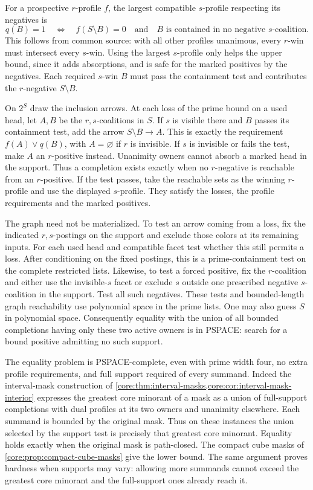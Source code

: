 For a prospective $r$-profile $f$, the largest
compatible $s$-profile respecting its negatives is
\[
 q(B)=1\quad\Longleftrightarrow\quad
  f(S\setminus B)=0\quad\text{and}\quad
  B\text{ is contained in no negative }s\text{-coalition}.
\]
This follows from common source: with all other
profiles unanimous, every $r$-win must intersect every
$s$-win. Using the largest $s$-profile only helps
the upper bound, since it adds absorptions, and is
safe for the marked positives by the negatives.
Each required $s$-win $B$ must pass the containment
test and contributes the $r$-negative $S\setminus B$.

On $2^S$ draw the inclusion arrows. At each loss of
the prime bound on a used head, let $A,B$ be the
$r,s$-coalitions in $S$. If $s$ is visible there and
$B$ passes its containment test, add the arrow
$S\setminus B\to A$. This is exactly the requirement
$f(A)\lor q(B)$, with $A=\varnothing$ if $r$ is
invisible. If $s$ is invisible or fails the test,
make $A$ an $r$-positive instead. Unanimity owners
cannot absorb a marked head in the support.
Thus a completion exists exactly when no $r$-negative
is reachable from an $r$-positive. If the test passes,
take the reachable sets as the winning $r$-profile
and use the displayed $s$-profile. They satisfy the
losses, the profile requirements and the marked
positives.

The graph need not be materialized. To test an arrow
coming from a loss, fix the indicated $r,s$-postings
on the support and exclude those colors at its
remaining inputs. For each used head and compatible
facet test whether this still permits a loss. After
conditioning on the fixed postings, this is a
prime-containment test on the complete restricted
lists. Likewise, to test a forced positive, fix the
$r$-coalition and either use the invisible-$s$ facet
or exclude $s$ outside one prescribed negative
$s$-coalition in the support. Test all such negatives.
These tests and bounded-length graph reachability
use polynomial space in the prime lists. One may also
guess $S$ in polynomial space. Consequently equality
with the union of all bounded completions having
only these two active owners is in PSPACE: search
for a bound positive admitting no such support.

The equality problem is PSPACE-complete, even with
prime width four, no extra profile requirements,
and full support required of every summand. Indeed
the interval-mask construction of
\cref{core:thm:interval-masks,core:cor:interval-mask-interior}
expresses the greatest core minorant of a mask as a
union of full-support completions with dual profiles
at its two owners and unanimity elsewhere. Each
summand is bounded by the original mask. Thus on
these instances the union selected by the support
test is precisely that greatest core minorant.
Equality holds exactly when the original mask is
path-closed. The compact cube masks of
\cref{core:prop:compact-cube-masks} give the lower
bound. The same argument proves hardness when
supports may vary: allowing more summands cannot
exceed the greatest core minorant and the
full-support ones already reach it.

